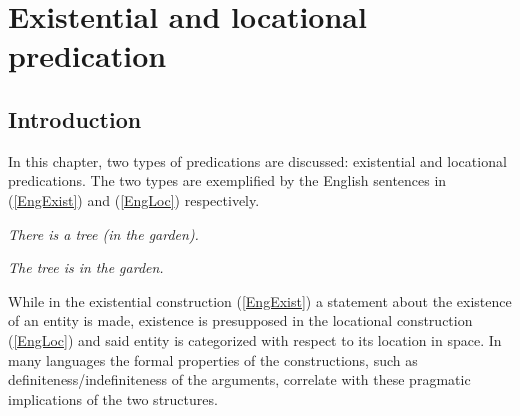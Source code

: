 \chapter{Existential and locational predication}\label{existpred}



\section{Introduction}

In this chapter, two types of predications are discussed: existential and locational predications.
The two types are exemplified by the English sentences in (\ref{EngExist}) and (\ref{EngLoc}) respectively.

\begin{exe}\ex\label{EngExist} \textit{There is a tree (in the garden).}\end{exe}
\begin{exe}\ex\label{EngLoc} \textit{The tree is in the garden.} \end{exe}

While in the existential construction (\ref{EngExist}) a statement about the existence of an entity is made, existence is presupposed in the locational construction (\ref{EngLoc}) and said entity is categorized with respect to its location in space.
In many languages the formal properties of the constructions, such as definiteness/indefiniteness of the arguments, correlate with these pragmatic implications of the two structures.

